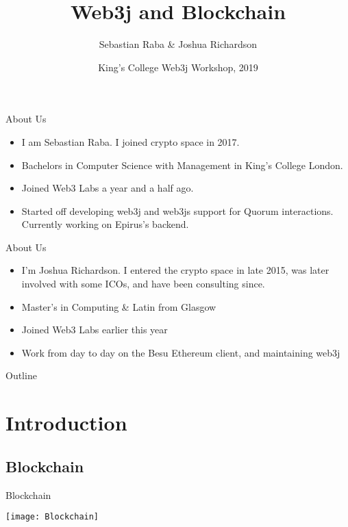 \documentclass{beamer}
\title{Web3j and Blockchain}
\author{Sebastian Raba \& Joshua Richardson}
\institute[] %
{
  Blockchain Platform Engineers\\
  Web3 Labs
}
\date{King's College Web3j Workshop, 2019}
\begin{document}
\begin{frame}
  \titlepage
\end{frame}

\begin{frame}{About Us}
	\begin{itemize}
		\item {
		I am Sebastian Raba. I joined crypto space in 2017.
		}
		\item {
			Bachelors in Computer Science with Management in King’s College London. 
		}
		\item {
		Joined Web3 Labs a year and a half ago.
		}
		\item {
		Started off developing web3j and web3js support for Quorum interactions. Currently working on  Epirus’s backend. 
		}
	\end{itemize}
\end{frame}

\begin{frame}{About Us}
	\begin{itemize}
		\item {
			I’m Joshua Richardson. I entered the crypto space in late 2015, was later involved with some ICOs, and have been consulting since.
		}
		\item {
Master’s in Computing \& Latin from Glasgow
		}
		\item {
			Joined Web3 Labs earlier this year
		}
		\item {
			Work from day to day on the Besu Ethereum client, and maintaining web3j
		}
	\end{itemize}
\end{frame}



\begin{frame}{Outline}
  \tableofcontents
\end{frame}

\section{Introduction}

\subsection{Blockchain}

\begin{frame}{Blockchain}
	\begin{center}
		\texttt{[image: Blockchain]}
	\end{center}
\end{frame}
\end{document}
